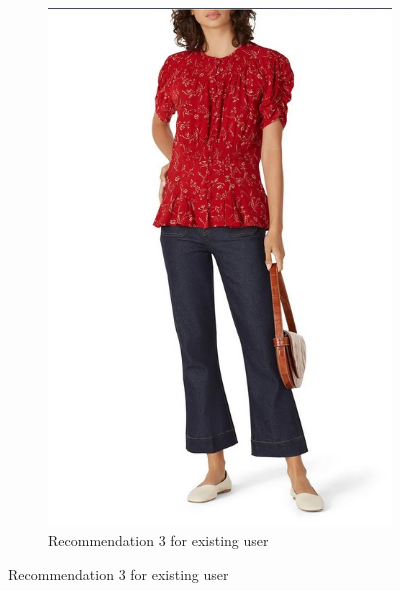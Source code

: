 \documentclass[conference]{IEEEtran}
\begin{document}
\begin{figure}[!htbp]
  \centering
  \begin{subfigure}[b]{0.3\textwidth}
    \centering
    \includegraphics[width=\textwidth]{r3.jpg}
    \caption{Recommendation 3 for existing user}
    \label{fig:Recommendations3}
  \end{subfigure}  
  

\end{figure}
\end{document}
